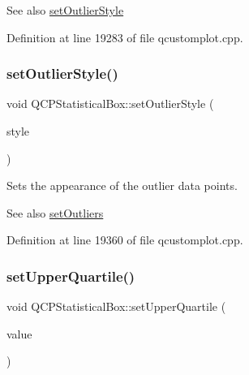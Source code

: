 \begin{DoxySeeAlso}{See also}
\hyperlink{class_q_c_p_statistical_box_ad5241943422eb8e58360a97e99ad6aa7}{set\+Outlier\+Style} 
\end{DoxySeeAlso}


Definition at line 19283 of file qcustomplot.\+cpp.

\mbox{\label{class_q_c_p_statistical_box_ad5241943422eb8e58360a97e99ad6aa7}} 
\subsubsection{\texorpdfstring{set\+Outlier\+Style()}{setOutlierStyle()}}
{\footnotesize\ttfamily void Q\+C\+P\+Statistical\+Box\+::set\+Outlier\+Style (\begin{DoxyParamCaption}\item[{const \hyperlink{class_q_c_p_scatter_style}{Q\+C\+P\+Scatter\+Style} \&}]{style }\end{DoxyParamCaption})}

Sets the appearance of the outlier data points.

\begin{DoxySeeAlso}{See also}
\hyperlink{class_q_c_p_statistical_box_af9bc09620e0bf93bf444ee35e5800d1d}{set\+Outliers} 
\end{DoxySeeAlso}


Definition at line 19360 of file qcustomplot.\+cpp.

\mbox{\label{class_q_c_p_statistical_box_a65a1375f941c5a2077b5201229e89346}} 
\subsubsection{\texorpdfstring{set\+Upper\+Quartile()}{setUpperQuartile()}}
{\footnotesize\ttfamily void Q\+C\+P\+Statistical\+Box\+::set\+Upper\+Quartile (\begin{DoxyParamCaption}\item[{double}]{value }\end{DoxyParamCaption})}


